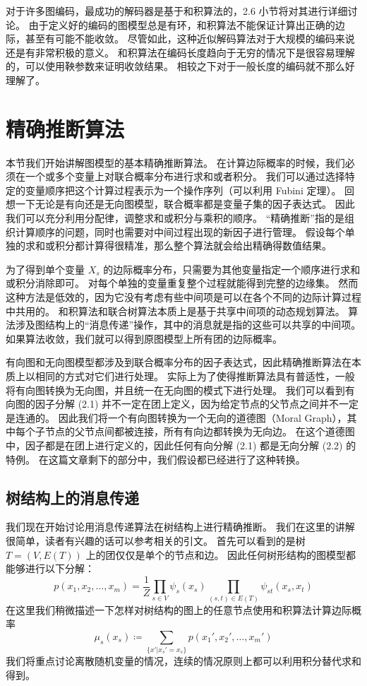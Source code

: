 对于许多图编码，最成功的解码器是基于和积算法的，2.6 小节将对其进行详细讨论。
由于定义好的编码的图模型总是有环，和积算法不能保证计算出正确的边际，甚至有可能不能收敛。
尽管如此，这种近似解码算法对于大规模的编码来说还是有非常积极的意义。
和积算法在编码长度趋向于无穷的情况下是很容易理解的，可以使用鞅参数来证明收敛结果。
相较之下对于一般长度的编码就不那么好理解了。

\section{精确推断算法}

本节我们开始讲解图模型的基本精确推断算法。
在计算边际概率的时候，我们必须在一个或多个变量上对联合概率分布进行求和或者积分。
我们可以通过选择特定的变量顺序把这个计算过程表示为一个操作序列（可以利用 Fubini 定理）。
回想一下无论是有向还是无向图模型，联合概率都是变量子集的因子表达式。
因此我们可以充分利用分配律，调整求和或积分与乘积的顺序。
“精确推断”指的是组织计算顺序的问题，同时也需要对中间过程出现的新因子进行管理。
假设每个单独的求和或积分都计算得很精准，那么整个算法就会给出精确得数值结果。

为了得到单个变量 $X_s$ 的边际概率分布，只需要为其他变量指定一个顺序进行求和或积分消除即可。
对每个单独的变量重复整个过程就能得到完整的边缘集。
然而这种方法是低效的，因为它没有考虑有些中间项是可以在各个不同的边际计算过程中共用的。
和积算法和联合树算法本质上是基于共享中间项的动态规划算法。
算法涉及图结构上的“消息传递”操作，其中的消息就是指的这些可以共享的中间项。
如果算法收敛，我们就可以得到原图模型上所有团的边际概率。

有向图和无向图模型都涉及到联合概率分布的因子表达式，因此精确推断算法在本质上以相同的方式对它们进行处理。
实际上为了使得推断算法具有普适性，一般将有向图转换为无向图，并且统一在无向图的模式下进行处理。
我们可以看到有向图的因子分解 (2.1) 并不一定在团上定义，因为给定节点的父节点之间并不一定是连通的。
因此我们将一个有向图转换为一个无向的道德图（Moral Graph），其中每个子节点的父节点间都被连接，所有有向边都转换为无向边。
在这个道德图中，因子都是在团上进行定义的，因此任何有向分解 (2.1) 都是无向分解 (2.2) 的特例。
在这篇文章剩下的部分中，我们假设都已经进行了这种转换。

\subsection{树结构上的消息传递}

我们现在开始讨论用消息传递算法在树结构上进行精确推断。
我们在这里的讲解很简单，读者有兴趣的话可以参考相关的引文。
首先可以看到的是树 $T = (V, E(T))$ 上的团仅仅是单个的节点和边。
因此任何树形结构的图模型都能够进行以下分解：
\begin{equation}
    p(x_1, x_2, \dots, x_m) = \frac{1}{Z}\prod_{s \in V}\psi_s(x_s)\prod_{(s, t) \in E(T)}\psi_{st}(x_s, x_t)
\end{equation}
在这里我们稍微描述一下怎样对树结构的图上的任意节点使用和积算法计算边际概率
\begin{equation}
    \mu_s(x_s) \coloneqq \sum_{\{x'|x_s' = x_s\}}p(x_1', x_2', \dots, x_m')
\end{equation}
我们将重点讨论离散随机变量的情况，连续的情况原则上都可以利用积分替代求和得到。

